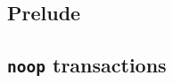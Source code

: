 \subsection{Prelude                      \lispDone{}}   \label{txn data: processing: sysf: prelude}   
\subsection{\texttt{noop} transactions   \lispDone{}}   \label{txn data: processing: sysf: noop}      
